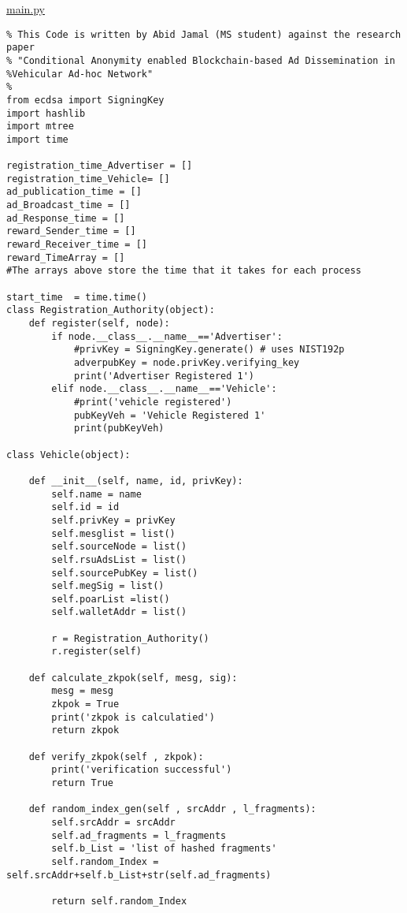\begin{linenumbers}
\resetlinenumber[1]

\hypertarget{milp_code}{}
\hyperlink{milp_text}{main.py}

\begin{lstlisting}
% This Code is written by Abid Jamal (MS student) against the research paper
% "Conditional Anonymity enabled Blockchain-based Ad Dissemination in %Vehicular Ad-hoc Network"
% 
from ecdsa import SigningKey
import hashlib
import mtree
import time

registration_time_Advertiser = []
registration_time_Vehicle= []
ad_publication_time = []
ad_Broadcast_time = []
ad_Response_time = []
reward_Sender_time = []
reward_Receiver_time = []
reward_TimeArray = []
#The arrays above store the time that it takes for each process

start_time  = time.time()
class Registration_Authority(object):
    def register(self, node):
        if node.__class__.__name__=='Advertiser':
            #privKey = SigningKey.generate() # uses NIST192p
            adverpubKey = node.privKey.verifying_key
            print('Advertiser Registered 1')
        elif node.__class__.__name__=='Vehicle':
            #print('vehicle registered')
            pubKeyVeh = 'Vehicle Registered 1'
            print(pubKeyVeh)

class Vehicle(object):

    def __init__(self, name, id, privKey):
        self.name = name
        self.id = id
        self.privKey = privKey
        self.mesglist = list()
        self.sourceNode = list()
        self.rsuAdsList = list()
        self.sourcePubKey = list()
        self.megSig = list()
        self.poarList =list()
        self.walletAddr = list()

        r = Registration_Authority()
        r.register(self)

    def calculate_zkpok(self, mesg, sig):
        mesg = mesg
        zkpok = True
        print('zkpok is calculatied')
        return zkpok
        
    def verify_zkpok(self , zkpok):  
        print('verification successful')
        return True

    def random_index_gen(self , srcAddr , l_fragments):
        self.srcAddr = srcAddr
        self.ad_fragments = l_fragments
        self.b_List = 'list of hashed fragments'
        self.random_Index = self.srcAddr+self.b_List+str(self.ad_fragments)

        return self.random_Index


\end{lstlisting}
\end{linenumbers}
